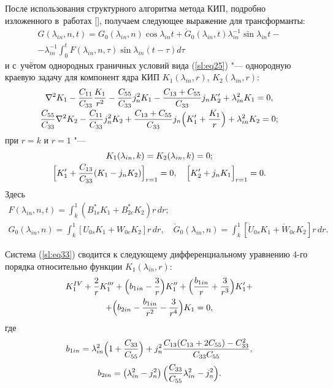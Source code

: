 После использования структурного алгоритма метода КИП, подробно  изложенного в~работах [], получаем следующее выражение для трансформанты:
\begin{multline}
\label{sl:eq32}
G(\lambda_{in}, n, t)=G_0 (\lambda _{in} , n)\cos \lambda _{in} t+\dot {G}_0 (\lambda _{in} , t)\lambda _{in}^{-1} \sin \lambda _{in} t-
\\
-\lambda _{in}^{-1} \int_0^t F( \lambda _{in} , n, \tau ) \sin \lambda _{in} (t-\tau )d\tau 
\end{multline}
и с~учётом однородных граничных условий вида (\ref{sl:eq25}) "---  однородную краевую задачу для компонент ядра КИП $K_1 (\lambda_{in}, r)$, $K_2(\lambda_{in}, r)$:
\begin{equation}
\label{sl:eq33}
\begin{array}{c}
\displaystyle
\nabla ^2K_1 -
\frac{C_{11} }{C_{33} }\frac{K_1 }{r^2}-
\frac{C_{55} }{C_{33} }j_n^2 K_1 -
\frac{C_{13} +C_{55}}{C_{33} }j_n {K}'_2 +\lambda _{in}^2 K_1 =0, \vspace{1mm} 
\\
\displaystyle
\frac{C_{55} }{C_{33} }\nabla ^2K_2 -
\frac{C_{11} }{C_{33} }j_n^2 K_2 +
\frac{C_{13} +C_{55}}{C_{33} }j_n \Bigl(K'_1 +\frac{K_1 }{r} \Bigr)+\lambda _{in}^2 K_2 =0;
\end{array}
\end{equation}
при $r=k$ и $r= 1$ "---
\begin{equation}
\label{sl:eq34}
\begin{array}{c}
K_1 ( \lambda _{in}, k )=K_2 (\lambda _{in} , k)=0; \vspace{1mm} \\ 
\displaystyle
\Bigl[ K'_1 +\frac{C_{13} }{C_{33} } (K_1 -j_n K_2 ) \Bigr]_{r=1} =0, 
\quad
\Bigl[K'_2 +j_n K_1 \Bigr]_{r=1} =0.
\end{array}
\end{equation}
Здесь 
\begin{gather*}
F(\lambda_{in}, n, t)=\int_k^1 ( B_{1s}^*  K_1 +B_{2c}^*  K_2 )r\,dr ;
\\
G_0 (\lambda _{in} , n)=\int_k^1[U_{0s} K_1 +W_{0c} K_2 ]r\,dr,\quad
\dot {G}_0 (\lambda _{in} , n)=
\int_k^1 [\dot {U}_{0s} K_1 +\dot {W}_{0c} K_2 ]r\,dr .
\end{gather*}


Система (\ref{sl:eq33}) сводится к следующему дифференциальному уравнению \mbox{4-го} порядка относительно функции $K_1 ( \lambda _{in} , r)$: 
\begin{multline}
\label{sl:eq35}
K_1^{IV} +\frac{2}{r}K'''_1 +\Bigl(b_{1in} -\frac{3}{r}\Bigr)K''_1 +
\Bigl( \frac{b_{1in} }{r}+\frac{3}{r^3} \Bigr)K'_1 + \\+
\Bigl(b_{2in} -\frac{b_{1in} }{r^2}-\frac{3}{r^4} \Bigr)K_1 =0, 
\end{multline}
где 
$$
b_{1in} =\lambda _{in}^2 \Bigl(1+\frac{C_{33} }{C_{55} } \Bigr)+
j_n^2 \frac{C_{13} (C_{13} +2C_{55} )-C_{33}^2 }{C_{33} C_{55} },$$ 
$$b_{2in} =\left( \lambda _{in}^2 -j_n^2  \right)
\Bigl( 
\frac{C_{33} }{C_{55} }\lambda _{in}^2 -j_n^2  \Bigr).$$

